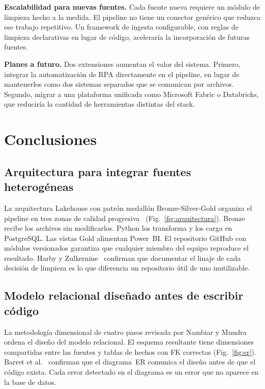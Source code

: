 \documentclass[10pt,twocolumn,spanish]{IEEEtran}
\begin{document}
\textbf{Escalabilidad para nuevas fuentes.}
Cada fuente nueva requiere un módulo de limpieza hecho a la medida.
El pipeline no tiene un conector genérico que reduzca ese trabajo
repetitivo. Un framework de ingesta configurable, con reglas de
limpieza declarativas en lugar de código, aceleraría la
incorporación de futuras fuentes.

\textbf{Planes a futuro.}
Dos extensiones aumentan el valor del sistema. Primero, integrar la
automatización de RPA directamente en el pipeline, en lugar de
mantenerlos como dos sistemas separados que se comunican por
archivos. Segundo, migrar a una plataforma unificada como Microsoft
Fabric o Databricks, que reduciría la cantidad de herramientas
distintas del stack.

\section{Conclusiones}

\subsection{Arquitectura para integrar fuentes heterogéneas}

La arquitectura Lakehouse con patrón medallón Bronze-Silver-Gold
organiza el pipeline en tres zonas de calidad
progresiva~\cite{azzabi2024,databricks2024}
(Fig.~\ref{fig:arquitectura}). Bronze recibe los archivos sin
modificarlos. Python los transforma y los carga en PostgreSQL. Las
vistas Gold alimentan Power~BI. El repositorio GitHub con módulos
versionados garantiza que cualquier miembro del equipo reproduce el
resultado. Harby y Zulkernine~\cite{harby2022} confirman que
documentar el linaje de cada decisión de limpieza es lo que
diferencia un repositorio útil de uno inutilizable.

\subsection{Modelo relacional diseñado antes de escribir código}

La metodología dimensional de cuatro pasos revisada por Nambiar y
Mundra~\cite{nambiar2022} ordena el diseño del modelo relacional. El
esquema resultante tiene dimensiones compartidas entre las fuentes y
tablas de hechos con FK correctas (Fig.~\ref{fig:er}). Barret
et al.~\cite{barret2025} confirman que el diagrama~ER comunica el
diseño antes de que el código exista. Cada error detectado en el
diagrama es un error que no aparece en la base de datos.
\end{document}
